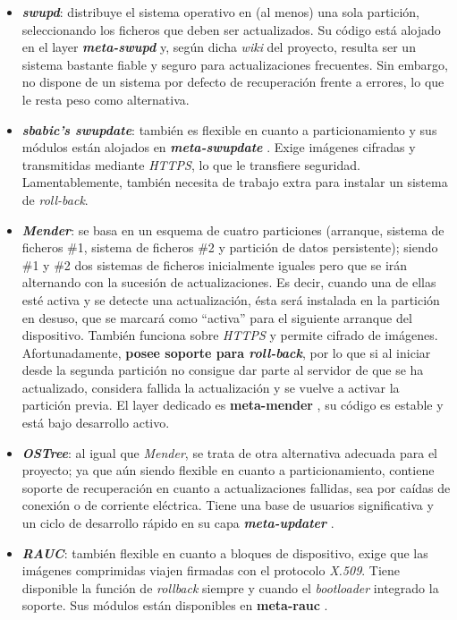 \begin{itemize}
	\item \textbf{\textit{swupd}}: distribuye el sistema operativo en (al menos) una sola partición, seleccionando los ficheros que deben ser actualizados. Su código está alojado en el layer \textbf{\textit{meta-swupd}} \cite{meta-swupd} y, según dicha \textit{wiki} del proyecto, resulta ser un sistema bastante fiable y seguro para actualizaciones frecuentes. Sin embargo, no dispone de un sistema por defecto de recuperación frente a errores, lo que le resta peso como alternativa.
	\item \textbf{\textit{sbabic's swupdate}}: también es flexible en cuanto a particionamiento y sus módulos están alojados en \textbf{\textit{meta-swupdate}} \cite{meta-swupdate}. Exige imágenes cifradas y transmitidas mediante \textit{HTTPS}, lo que le transfiere seguridad. Lamentablemente, también necesita de trabajo extra para instalar un sistema de \textit{roll-back}.
	\item \textbf{\textit{Mender}}: se basa en un esquema de cuatro particiones (arranque, sistema de ficheros \#1, sistema de ficheros \#2 y partición de datos persistente); siendo \#1 y \#2 dos sistemas de ficheros inicialmente iguales pero que se irán alternando con la sucesión de actualizaciones. Es decir, cuando una de ellas esté activa y se detecte una actualización, ésta será instalada en la partición en desuso, que se marcará como ``activa'' para el siguiente arranque del dispositivo. También funciona sobre \textit{HTTPS} y permite cifrado de imágenes. Afortunadamente, \textbf{posee soporte para \textit{roll-back}}, por lo que si al iniciar desde la segunda partición no consigue dar parte al servidor de que se ha actualizado, considera fallida la actualización y se vuelve a activar la partición previa. El layer dedicado es \textbf{meta-mender} \cite{meta-mender}, su código es estable y está bajo desarrollo activo.
	\item \textbf{\textit{OSTree}}: al igual que \textit{Mender}, se trata de otra alternativa adecuada para el proyecto; ya que aún siendo flexible en cuanto a particionamiento, contiene soporte de recuperación en cuanto a actualizaciones fallidas, sea por caídas de conexión o de corriente eléctrica. Tiene una base de usuarios significativa y un ciclo de desarrollo rápido en su capa \textbf{\textit{meta-updater}} \cite{meta-updater}.
	\item \textbf{\textit{RAUC}}: también flexible en cuanto a bloques de dispositivo, exige que las imágenes comprimidas viajen firmadas con el protocolo \textit{X.509}. Tiene disponible la función de \textit{rollback} siempre y cuando el \textit{bootloader} integrado la soporte. Sus módulos están disponibles en \textbf{meta-rauc} \cite{meta-rauc}.
\end{itemize}

